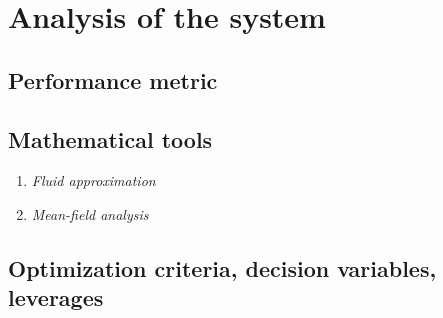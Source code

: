 \section{Analysis of the system}
\subsection{Performance metric}
\subsection{Mathematical tools}
\begin{enumerate}
\item {\em Fluid approximation}
\item {\em Mean-field analysis}
\end{enumerate}
\subsection{Optimization criteria, decision variables, leverages}
